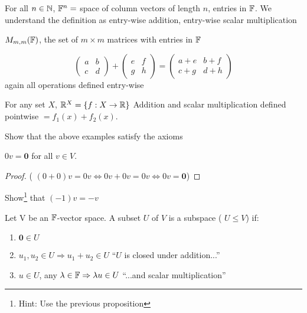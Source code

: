 \documentclass[a4paper]{article}
\begin{document}
\begin{eg}
	For all $ n \in \mathbb{N}  $, $ \mathbb{F}^{n} = $ space of column vectors of length $ n $, entries in $ \mathbb{F} $. We understand the definition as entry-wise addition, entry-wise scalar multiplication
	  
\end{eg}


\begin{eg}
	$ M_{m,m}(\mathbb{F}) $, the set of $ m \times m $ matrices with entries in $ \mathbb{F} $
	
	\[ \begin{pmatrix}
	a & b \\
	c & d
	\end{pmatrix} + \begin{pmatrix}
	e & f \\
	g & h
	\end{pmatrix} = \begin{pmatrix}
	a + e & b + f\\
	c + g & d + h
	\end{pmatrix} \]
	again all operations defined entry-wise
\end{eg}

\begin{eg}
	For any set $ X $, $ \mathbb{R}^{X} = \{ f : X \to \mathbb{R} \}$
	Addition and scalar multiplication defined pointwise $ = f_{1}(x) + f_{2} (x) $.
\end{eg}


\begin{ex}
	Show that the above examples satisfy the axioms
\end{ex}

\begin{prop} 
	$ 0 v = \mathbf{0} $ for all $ v \in V $.
\end{prop}

\begin{proof}
	( $ (0 + 0)v = 0v \iff 0 v + 0v = 0v \iff 0v = \mathbf{0} $)
\end{proof}

\begin{ex}
	Show\footnote{Hint: Use the previous proposition} that $ (-1)v = -v $
\end{ex}

\begin{defi}
	Let V be an $ \mathbb{F} $-vector space. A subset $ U $ of $ V $ is a subspace ( $ U \leq V $) if: 
	\begin{enumerate}
		\item $ \mathbf{0} \in U $
		\item $ u_{1}, u_{2} \in U  \Rightarrow u_{1} + u_{2} \in U $ ``$ U $ is closed under addition...''
		\item $ u \in U $, any $ \lambda \in \mathbb{F} \Rightarrow \lambda u \in U$ ``...and scalar multiplication''
	\end{enumerate}
\end{defi}
\end{document}
